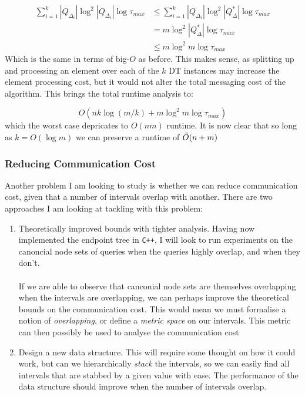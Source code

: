 \documentclass{article}
\begin{document}
\begin{align*}
    \sum_{i=1}^{k}  |Q_{\Delta_i}|\log^2 |Q_{\Delta_i}| \log\tau_{max} &\leq \sum_{i=1}^{k}  |Q_{\Delta_i}|\log^2 |Q_{\Delta}^*| \log\tau_{max} \\
    &= m\log^2 |Q_{\Delta}^*| \log\tau_{max} \\
    &\leq m\log^2 m \log\tau_{max}
\end{align*}
Which is the same in terms of big-$O$ as before. This makes sense, as splitting up and processing an element over each of the $k$ DT instances may increase the element processing cost, but it would not alter the total messaging cost of the algorithm. This brings the total runtime analysis to: 

$$O(nk\log (m/k) + m\log^2 m \log\tau_{max})$$
which the worst case depricates to $O(nm)$ runtime. It is now clear that so long as $k = O(\log m)$ we can preserve a runtime of $\Tilde{O}(n+m)$


\newpage
\subsubsection*{Reducing Communication Cost}

Another problem I am looking to study is whether we can reduce communication cost, given that a number of intervals overlap with another. There are two approaches I am looking at tackling with this problem: 
\begin{enumerate}
    \item Theoretically improved bounds with tighter analysis. Having now implemented the endpoint tree in \texttt{C++}, I will look to run experiments on the canoncial node sets of queries when the queries highly overlap, and when they don't. \\
    \\
    If we are able to observe that canconial node sets are themselves overlapping when the intervals are overlapping, we can perhaps improve the theoretical bounds on the communication cost. This would mean we must formalise a notion of \textit{overlapping}, or define a \textit{metric space} on our intervals. This metric can then possibly be used to analyse the communication cost


    \item Design a new data structure. This will require some thought on how it could work, but can we hierarchically \textit{stack} the intervals, so we can easily find all intervals that are stabbed by a given value with ease. The performance of the data structure should improve when the number of intervals overlap. 
\end{enumerate}
\\
\end{document}
